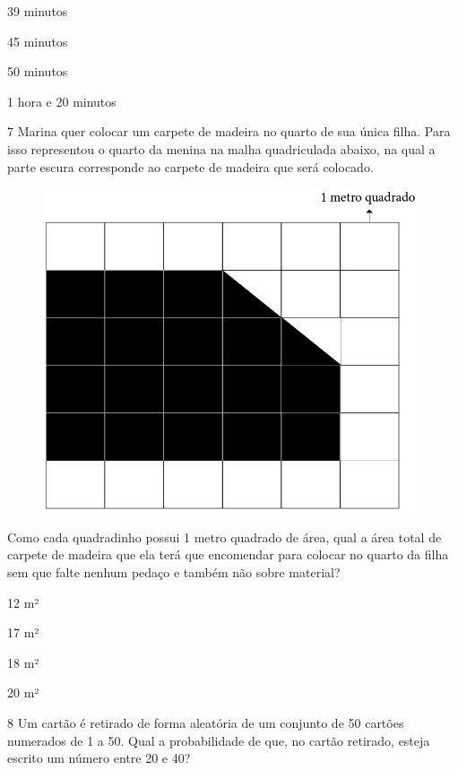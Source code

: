 \begin{minipage}{.5\textwidth}
\begin{escolha}
\item
  39 minutos
\item
  45 minutos
\item
  50 minutos
\item
  1 hora e 20 minutos
\end{escolha}
\end{minipage}

\num{7} Marina quer colocar um carpete de madeira no quarto de sua única
filha. Para isso representou o quarto da menina na malha quadriculada
abaixo, na qual a parte escura corresponde ao carpete de madeira que será
colocado.

\begin{figure}[htpb!]
\centering
\includegraphics[width=.5\textwidth]{../ilustracoes/MAT5/SAEB_5ANO_MAT_figura122.png}
\end{figure}

Como cada quadradinho possui 1 metro quadrado de área, qual a área total
de carpete de madeira que ela terá que encomendar para colocar no quarto
da filha sem que falte nenhum pedaço e também não sobre material?\bigskip

\begin{minipage}{.5\textwidth}
\begin{escolha}
\item
  12 m²
\item
  17 m²
\item
  18 m²
\item
  20 m²
\end{escolha}
\end{minipage}

\pagebreak
\num{8} Um cartão é retirado de forma aleatória de um conjunto de 50
cartões numerados de 1 a 50. Qual a probabilidade de que, no cartão
retirado, esteja escrito um número entre 20 e 40?

